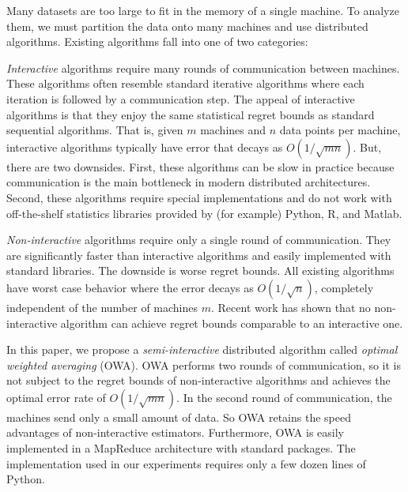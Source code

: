 \documentclass[twoside]{article}
\begin{document}
Many datasets are too large to fit in the memory of a single machine.
To analyze them, we must partition the data onto many machines and use distributed algorithms.
Existing algorithms fall into one of two categories:

\emph{Interactive} algorithms require many rounds of communication between machines.
These algorithms often resemble standard iterative algorithms where each iteration is followed by a communication step.
The appeal of interactive algorithms is that they enjoy the same statistical regret bounds as standard sequential algorithms.
That is, given $m$ machines and $n$ data points per machine, interactive algorithms typically have error that decays as $O(1/\sqrt{mn})$.
But, there are two downsides.
First, these algorithms can be slow in practice because communication is the main bottleneck in modern distributed architectures.
Second, these algorithms require special implementations and do not work with off-the-shelf statistics libraries provided by (for example) Python, R, and Matlab.

\emph{Non-interactive} algorithms require only a single round of communication.
They are significantly faster than interactive algorithms and  easily implemented with standard libraries.
The downside is worse regret bounds.
All existing algorithms have worst case behavior where the error decays as $O(1/\sqrt{n})$, 
completely independent of the number of machines $m$.
Recent work has shown that no non-interactive algorithm can achieve regret bounds comparable to an interactive one.

In this paper, we propose a \emph{semi-interactive} distributed algorithm called \emph{optimal weighted averaging} (OWA).
OWA performs two rounds of communication,
so it is not subject to the regret bounds of non-interactive algorithms and achieves the optimal error rate of $O(1/\sqrt{mn})$.
In the second round of communication, the machines send only a small amount of data.
So OWA retains the speed advantages of non-interactive estimators.
Furthermore, OWA is easily implemented in a MapReduce architecture with standard packages.
The implementation used in our experiments requires only a few dozen lines of Python.
\end{document}
